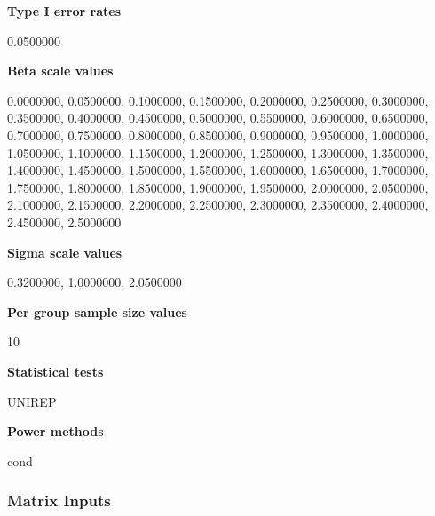 {\bf Type I error rates}

0.0500000

{\bf Beta scale values}

0.0000000, 0.0500000, 0.1000000, 0.1500000, 0.2000000, 0.2500000, 0.3000000, 0.3500000, 0.4000000, 0.4500000, 0.5000000, 0.5500000, 0.6000000, 0.6500000, 0.7000000, 0.7500000, 0.8000000, 0.8500000, 0.9000000, 0.9500000, 1.0000000, 1.0500000, 1.1000000, 1.1500000, 1.2000000, 1.2500000, 1.3000000, 1.3500000, 1.4000000, 1.4500000, 1.5000000, 1.5500000, 1.6000000, 1.6500000, 1.7000000, 1.7500000, 1.8000000, 1.8500000, 1.9000000, 1.9500000, 2.0000000, 2.0500000, 2.1000000, 2.1500000, 2.2000000, 2.2500000, 2.3000000, 2.3500000, 2.4000000, 2.4500000, 2.5000000

{\bf Sigma scale values}

0.3200000, 1.0000000, 2.0500000

{\bf Per group sample size values}

10

{\bf Statistical tests}

UNIREP

{\bf Power methods}

cond

\subsubsection{Matrix Inputs}

